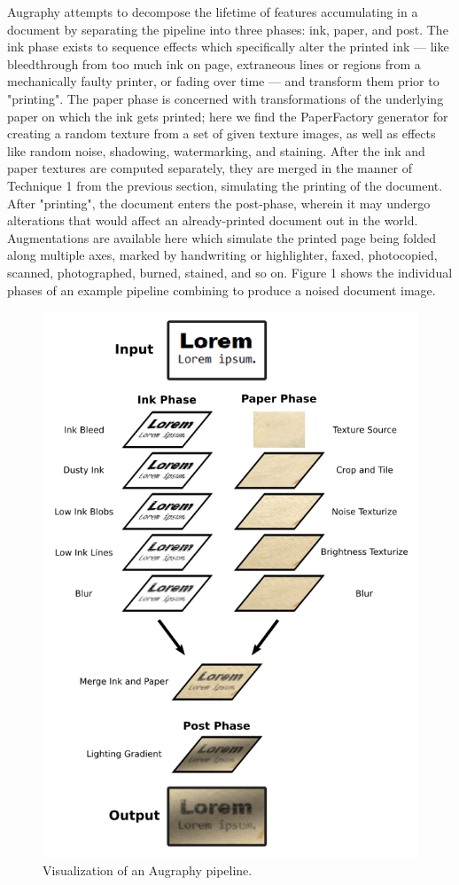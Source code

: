 \documentclass[runningheads]{llncs}
\begin{document}
Augraphy attempts to decompose the lifetime of features accumulating in a document by separating the pipeline into three phases: ink, paper, and post. The ink phase exists to sequence effects which specifically alter the printed ink — like bleedthrough from too much ink on page, extraneous lines or regions from a mechanically faulty printer, or fading over time — and transform them prior to "printing". The paper phase is concerned with transformations of the underlying paper on which the ink gets printed; here we find the PaperFactory generator for creating a random texture from a set of given texture images, as well as effects like random noise, shadowing, watermarking, and staining. After the ink and paper textures are computed separately, they are merged in the manner of Technique 1 from the previous section, simulating the printing of the document. After "printing", the document enters the post-phase, wherein it may undergo alterations that would affect an already-printed document out in the world. Augmentations are available here which simulate the printed page being folded along multiple axes, marked by handwriting or highlighter, faxed, photocopied, scanned, photographed, burned, stained, and so on. Figure 1 shows the individual phases of an example pipeline combining to produce a noised document image.
\begin{figure}
\includegraphics[width=\textwidth]{pipeline.png}
\caption{Visualization of an Augraphy pipeline.} \label{fig1}
\end{figure}
\end{document}
